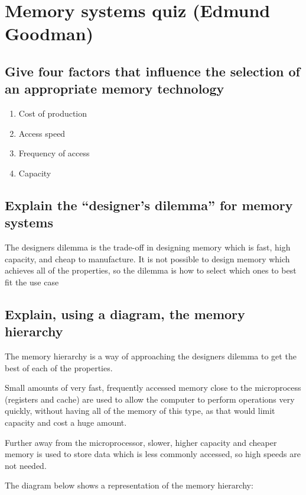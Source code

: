 \documentclass{article}
\begin{document}
\newpage
\section{Memory systems quiz (Edmund Goodman)}

\subsection{Give four factors that influence the selection of an
appropriate memory technology}

\begin{enumerate}
\item
  Cost of production
\item
  Access speed
\item
  Frequency of access
\item
  Capacity
\end{enumerate}


\subsection{Explain the ``designer's dilemma'' for memory systems}

The designers dilemma is the trade-off in designing memory which is
fast, high capacity, and cheap to manufacture. It is not possible to
design memory which achieves all of the properties, so the dilemma is
how to select which ones to best fit the use case


\subsection{Explain, using a diagram, the memory hierarchy}

The memory hierarchy is a way of approaching the designers dilemma to
get the best of each of the properties.

Small amounts of very fast, frequently accessed memory close to the
microprocess (registers and cache) are used to allow the computer to
perform operations very quickly, without having all of the memory of
this type, as that would limit capacity and cost a huge amount.

Further away from the microprocessor, slower, higher capacity and
cheaper memory is used to store data which is less commonly accessed, so
high speeds are not needed.

The diagram below shows a representation of the memory hierarchy:
\end{document}
